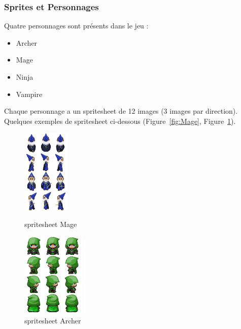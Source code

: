 \documentclass[11pt]{article}
\begin{document}
            \subsubsection{Sprites et Personnages}
            Quatre personnages sont présents dans le jeu :
            \begin{itemize}
                \item Archer
                \item Mage
                \item Ninja
                \item Vampire
            \end{itemize}
            Chaque personnage a un spritesheet de 12 images (3 images par direction).\\
            Quelques exemples de spritesheet ci-dessous (Figure~\ref{fig:Mage}, Figure~\ref{fig:Archer}). 
            \begin{figure}[H]
                \centering
                \begin{minipage}{0.45\textwidth}
                    \centering
                    \includegraphics[height=4cm]{mageSrc.png}
                    \caption{spritesheet Mage}
                    \label{fig:Mage}
                \end{minipage}
                \hfill
                \begin{minipage}{0.45\textwidth}
                    \centering
                    \includegraphics[height=4cm]{archerSRC.png}
                    \caption{spritesheet Archer}
                    \label{fig:Archer}
                \end{minipage}
            \end{figure}
\end{document}
